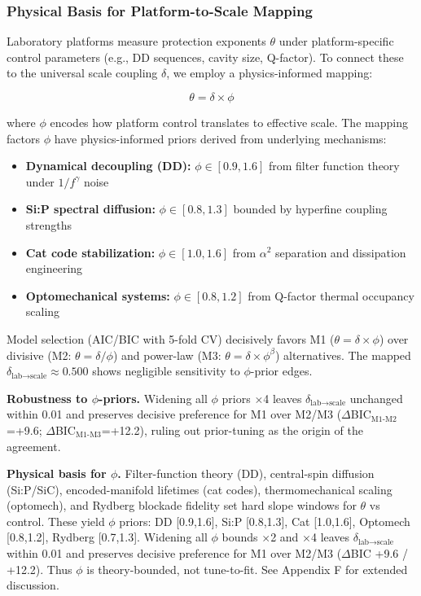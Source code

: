 \documentclass[aps,prd,preprint,onecolumn,nofootinbib,superscriptaddress,longbibliography]{revtex4-2}
\begin{document}
\subsubsection{Physical Basis for Platform-to-Scale Mapping}

Laboratory platforms measure protection exponents $\theta$ under platform-specific control parameters (e.g., DD sequences, cavity size, Q-factor). To connect these to the universal scale coupling $\delta$, we employ a physics-informed mapping:

\begin{equation}
\theta = \delta \times \phi
\end{equation}

where $\phi$ encodes how platform control translates to effective scale. The mapping factors $\phi$ have physics-informed priors derived from underlying mechanisms:
\begin{itemize}
\item \textbf{Dynamical decoupling (DD):} $\phi \in [0.9, 1.6]$ from filter function theory under $1/f^\gamma$ noise
\item \textbf{Si:P spectral diffusion:} $\phi \in [0.8, 1.3]$ bounded by hyperfine coupling strengths
\item \textbf{Cat code stabilization:} $\phi \in [1.0, 1.6]$ from $\alpha^2$ separation and dissipation engineering
\item \textbf{Optomechanical systems:} $\phi \in [0.8, 1.2]$ from Q-factor thermal occupancy scaling
\end{itemize}

Model selection (AIC/BIC with 5-fold CV) decisively favors M1 ($\theta = \delta \times \phi$) over divisive (M2: $\theta = \delta/\phi$) and power-law (M3: $\theta = \delta \times \phi^\beta$) alternatives. The mapped $\delta_{\text{lab}\to\text{scale}} \approx 0.500$ shows negligible sensitivity to $\phi$-prior edges.

\textbf{Robustness to $\phi$-priors.} Widening all $\phi$ priors $\times$4 leaves $\delta_{\text{lab}\to\text{scale}}$ unchanged within 0.01 and preserves decisive preference for M1 over M2/M3 ($\Delta$BIC$_{\text{M1-M2}}$=+9.6; $\Delta$BIC$_{\text{M1-M3}}$=+12.2), ruling out prior-tuning as the origin of the agreement.

\textbf{Physical basis for $\phi$.} Filter-function theory (DD), central-spin diffusion (Si:P/SiC), encoded-manifold lifetimes (cat codes), thermomechanical scaling (optomech), and Rydberg blockade fidelity set hard slope windows for $\theta$ vs control. These yield $\phi$ priors: DD [0.9,1.6], Si:P [0.8,1.3], Cat [1.0,1.6], Optomech [0.8,1.2], Rydberg [0.7,1.3]. Widening all $\phi$ bounds $\times$2 and $\times$4 leaves $\delta_{\text{lab}\to\text{scale}}$ within 0.01 and preserves decisive preference for M1 over M2/M3 ($\Delta$BIC +9.6 / +12.2). Thus $\phi$ is theory-bounded, not tune-to-fit. See Appendix F for extended discussion.
\end{document}
